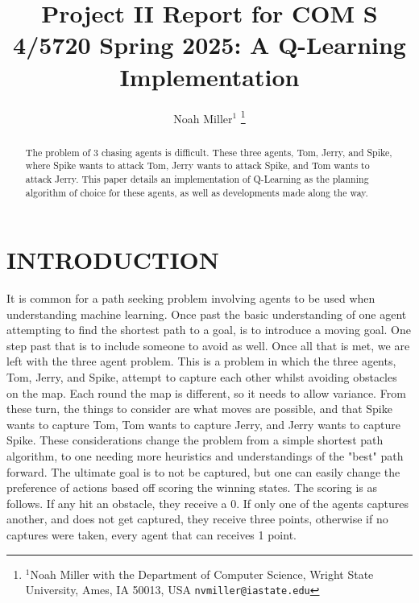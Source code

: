 \documentclass[letterpaper, 10 pt, conference]{ieeeconf}   %
\title{\LARGE \bf
Project II Report for COM S 4/5720 Spring 2025: A Q-Learning Implementation
}
\author{Noah Miller$^{1}$%
\thanks{$^{1}$Noah Miller with the Department of Computer Science, Wright State University,
        Ames, IA 50013, USA
        {\tt\small nvmiller@iastate.edu}}%
}
\begin{document}
\maketitle
\thispagestyle{empty}
\pagestyle{empty}


\begin{abstract}

	The problem of 3 chasing agents is difficult. These three agents, Tom, Jerry, and Spike, where Spike wants to attack Tom, Jerry wants to attack Spike, and Tom wants to attack Jerry.
	This paper details an implementation of Q-Learning as the planning algorithm of choice for these agents, as well as developments made along the way.

\end{abstract}




\section{INTRODUCTION}

It is common for a path seeking problem involving agents to be used when understanding machine learning. Once past the basic understanding of one agent attempting
to find the shortest path to a goal, is to introduce a moving goal. One step past that is to include someone to avoid as well. Once all that is met, we are left with the three agent problem. This
is a problem in which the three agents, Tom, Jerry, and Spike, attempt to capture each other whilst avoiding obstacles on the map. Each round the map is different, so it needs to allow variance.
From these turn, the things to consider are what moves are possible, and that Spike wants to capture Tom, Tom wants to capture Jerry, and Jerry wants to capture Spike. These considerations
change the problem from a simple shortest path algorithm, to one needing more heuristics and understandings of the "best" path forward. The ultimate goal is to not be captured,
but one can easily change the preference of actions based off scoring the winning states. The scoring is as follows. If any hit an obstacle, they receive a 0. If
only one of the agents captures another, and does not get captured, they receive three points, otherwise if no captures were taken, every agent that can receives 1 point.
\end{document}
